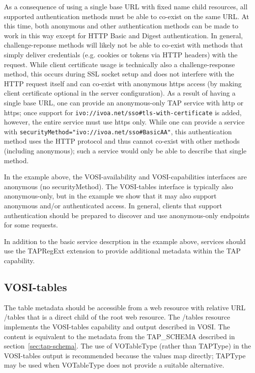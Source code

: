 \documentclass[11pt,letter]{ivoa}
\newcommand{\tapschema}{TAP\_SCHE\-MA}
\newcommand{\tapschema}{\mbox{%
  \relsize{-0.5}TAP\discretionary{-}{}{\kern-2pt\_}SCHEMA}}
\begin{document}
As a consequence of using a single base URL with fixed name child resources, all supported authentication 
methods must be able to co-exist on the same URL. At this time, both anonymous and other authentication 
methods can be made to work in this way except for HTTP Basic and Digest authentication. In general, 
challenge-reponse methods will likely not be able to co-exist with methods that simply deliver credentials
(e.g. cookies or tokens via HTTP headers) with the request. While client certificate usage is technically also
a challenge-response method, this occurs during SSL socket setup and does not interfere with the HTTP request itself and can co-exist with anonymous https access (by making client certificate optional in the server 
configuration). As a result of having a single base URL, one can provide an anonymous-only TAP service with http or https; once support for \verb|ivo://ivoa.net/sso#tls-with-certificate| is added, however, the entire service
must use https only. While one can provide a service with \verb|securityMethod="ivo://ivoa.net/sso#BasicAA"|, 
this authentication method uses the HTTP protocol and thus cannot co-exist with other methods (including
anonymous); such a service would only be able to describe that single method.

In the example above, the VOSI-availability and VOSI-capabilities interfaces are anonymous (no securityMethod). 
The VOSI-tables interface is typically also anonymous-only, but in the example we show that it may also support
anonymous and/or authenticated access. In general, clients that support authentication should be prepared to discover and use anonymous-only endpoints for some requests. 

In addition to the basic service descrption in the example above, services should use the TAPRegExt
\citep{std:TAPREGEXT} extension to provide additional metadata within the TAP capability.

\subsection{VOSI-tables}
\label{sec:vosi-tables}

The table metadata should be accessible from a web resource with relative URL 
/tables that is a direct child of the root web resource. The /tables resource 
implements the VOSI-tables capability and output described in VOSI.
The content is equivalent to the metadata from the 
\tapschema{} described in section~\ref{sec:tap-schema}. The use of VOTableType 
(rather than TAPType) in the VOSI-tables output  is recommended because the values 
map directly; TAPType may be used when VOTableType does not provide a suitable
alternative.
\end{document}
